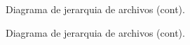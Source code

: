 \documentclass[a4paper,10pt]{article}
\begin{document}
\begin{figure}[H]
\centering
{}
\caption{Diagrama de jerarquia de archivos (cont).}
\end{figure}

\begin{figure}[H]
\centering
{}
\caption{Diagrama de jerarquia de archivos (cont).}
\end{figure}
\end{document}

